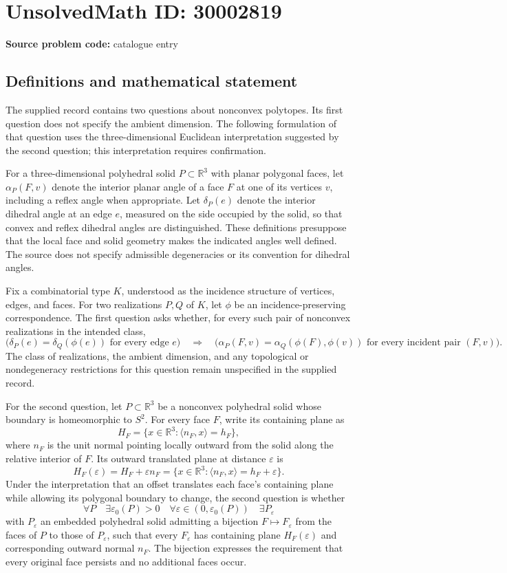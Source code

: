 \documentclass[11pt]{article}
\newcommand{\R}{\mathbb{R}}
\begin{document}
\section*{UnsolvedMath ID: 30002819}
\textbf{Source problem code:} catalogue entry
\subsection{Definitions and mathematical statement}
The supplied record contains two questions about nonconvex polytopes. Its first question does not specify the ambient dimension. The following formulation of that question uses the three-dimensional Euclidean interpretation suggested by the second question; this interpretation requires confirmation.

For a three-dimensional polyhedral solid \(P\subset\R^3\) with planar polygonal faces, let \(\alpha_P(F,v)\) denote the interior planar angle of a face \(F\) at one of its vertices \(v\), including a reflex angle when appropriate. Let \(\delta_P(e)\) denote the interior dihedral angle at an edge \(e\), measured on the side occupied by the solid, so that convex and reflex dihedral angles are distinguished. These definitions presuppose that the local face and solid geometry makes the indicated angles well defined. The source does not specify admissible degeneracies or its convention for dihedral angles.

Fix a combinatorial type \(K\), understood as the incidence structure of vertices, edges, and faces. For two realizations \(P,Q\) of \(K\), let \(\phi\) be an incidence-preserving correspondence. The first question asks whether, for every such pair of nonconvex realizations in the intended class,
\[
 \bigl(\delta_P(e)=\delta_Q(\phi(e))\text{ for every edge }e\bigr)
 \quad\Longrightarrow\quad
 \bigl(\alpha_P(F,v)=\alpha_Q(\phi(F),\phi(v))
 \text{ for every incident pair }(F,v)\bigr).
\]
The class of realizations, the ambient dimension, and any topological or nondegeneracy restrictions for this question remain unspecified in the supplied record.

For the second question, let \(P\subset\R^3\) be a nonconvex polyhedral solid whose boundary is homeomorphic to \(S^2\). For every face \(F\), write its containing plane as
\[
 H_F=\{x\in\R^3:\langle n_F,x\rangle=h_F\},
\]
where \(n_F\) is the unit normal pointing locally outward from the solid along the relative interior of \(F\). Its outward translated plane at distance \(\varepsilon\) is
\[
 H_F(\varepsilon)=H_F+\varepsilon n_F
 =\{x\in\R^3:\langle n_F,x\rangle=h_F+\varepsilon\}.
\]
Under the interpretation that an offset translates each face's containing plane while allowing its polygonal boundary to change, the second question is whether
\[
 \forall P\quad\exists\varepsilon_0(P)>0\quad
 \forall\varepsilon\in(0,\varepsilon_0(P))\quad
 \exists P_\varepsilon
\]
with \(P_\varepsilon\) an embedded polyhedral solid admitting a bijection \(F\mapsto F_\varepsilon\) from the faces of \(P\) to those of \(P_\varepsilon\), such that every \(F_\varepsilon\) has containing plane \(H_F(\varepsilon)\) and corresponding outward normal \(n_F\). The bijection expresses the requirement that every original face persists and no additional faces occur.
\end{document}
